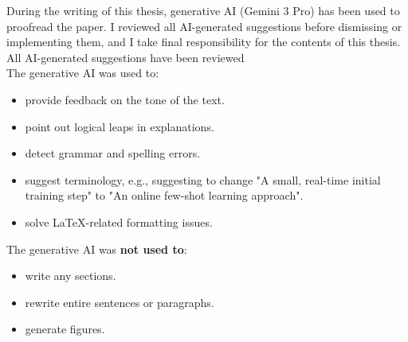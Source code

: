 During the writing of this thesis, generative AI (Gemini 3 Pro) has been used to proofread the paper.
I reviewed all AI-generated suggestions before dismissing or implementing them, and I take final responsibility for the contents of this thesis.
All AI-generated suggestions have been reviewed
\\The generative AI was used to:
\begin{itemize}[itemsep=0pt]
    \item provide feedback on the tone of the text.
    \item point out logical leaps in explanations.
    \item detect grammar and spelling errors.
    \item suggest terminology, e.g., suggesting to change "A small, real-time initial training step" to "An online few-shot learning approach".
    \item solve LaTeX-related formatting issues.
\end{itemize}
The generative AI was \textbf{not used to}:
\begin{itemize}[itemsep=0pt]
    \item write any sections.
    \item rewrite entire sentences or paragraphs.
    \item generate figures.
\end{itemize}




